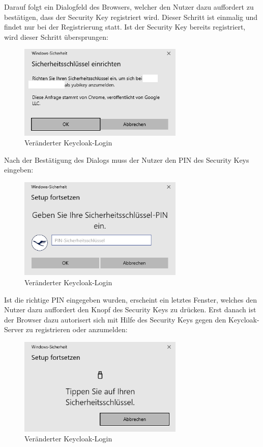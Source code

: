 Darauf folgt ein Dialogfeld des Browsers, welcher den Nutzer dazu auffordert zu bestätigen, dass der Security Key registriert wird. Dieser Schritt ist einmalig und findet nur bei der Registrierung statt. Ist der Security Key bereits registriert, wird dieser Schritt übersprungen:

\begin{figure}[h]
	\centering 
	\includegraphics[width=0.7\textwidth]{img/abbildungen/reg002.png}
	\captionsetup{format=hang}
	\caption{Veränderter Keycloak-Login}
\end{figure}

Nach der Bestätigung des Dialogs muss der Nutzer den PIN des Security Keys eingeben:

\begin{figure}[H]
	\centering 
	\includegraphics[width=0.7\textwidth]{img/abbildungen/reg003.png}
	\captionsetup{format=hang}
	\caption{Veränderter Keycloak-Login}
\end{figure}

Ist die richtige PIN eingegeben wurden, erscheint ein letztes Fenster, welches den Nutzer dazu auffordert den Knopf des Security Keys zu drücken. Erst danach ist der Browser dazu autorisert sich mit Hilfe des Security Keys gegen den Keycloak-Server zu registrieren oder anzumelden:

\begin{figure}[h]
	\centering 
	\includegraphics[width=0.7\textwidth]{img/abbildungen/reg004.png}
	\captionsetup{format=hang}
	\caption{Veränderter Keycloak-Login}
\end{figure}


